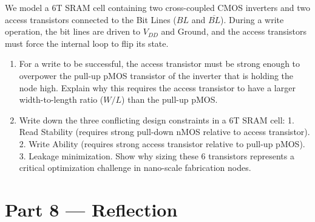 \documentclass[12pt, a4paper]{book}
\begin{document}
\begin{deepbox}
\begin{enumerate}[label=\textbf{D\arabic*.}]
        We model a 6T SRAM cell containing two cross-coupled CMOS inverters and two access transistors connected to the Bit Lines ($BL$ and $\overline{BL}$).
        During a write operation, the bit lines are driven to $V_{DD}$ and Ground, and the access transistors must force the internal loop to flip its state.
        \begin{enumerate}[label=(\alph*)]
          \item For a write to be successful, the access transistor must be strong enough to overpower the pull-up pMOS transistor of the inverter that is holding the node high.
                Explain why this requires the access transistor to have a larger width-to-length ratio ($W/L$) than the pull-up pMOS.
          \item Write down the three conflicting design constraints in a 6T SRAM cell:
                1. Read Stability (requires strong pull-down nMOS relative to access transistor).
                2. Write Ability (requires strong access transistor relative to pull-up pMOS).
                3. Leakage minimization.
                Show why sizing these 6 transistors represents a critical optimization challenge in nano-scale fabrication nodes.
        \end{enumerate}
\end{enumerate}
\end{deepbox}

\newpage

\section{Part 8 --- Reflection}
\end{document}
